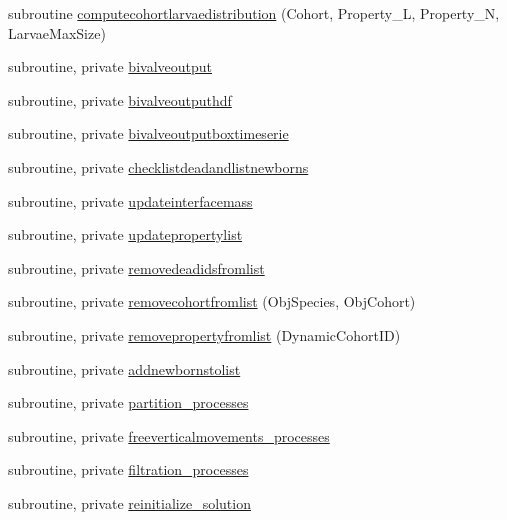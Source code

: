 \begin{DoxyCompactItemize}
subroutine \mbox{\hyperlink{namespacemodulewaterproperties_a21e9506395b0784b11cea81e68719de8}{computecohortlarvaedistribution}} (Cohort, Property\+\_\+L, Property\+\_\+N, Larvae\+Max\+Size)
\item 
subroutine, private \mbox{\hyperlink{namespacemodulewaterproperties_a8446703f7cbfef308ed1b6f7114594a2}{bivalveoutput}}
\item 
subroutine, private \mbox{\hyperlink{namespacemodulewaterproperties_a6d9213c5f38db58c01899d8b68076950}{bivalveoutputhdf}}
\item 
subroutine, private \mbox{\hyperlink{namespacemodulewaterproperties_afcdb7811c7721d558a0d6ec94b87f297}{bivalveoutputboxtimeserie}}
\item 
subroutine, private \mbox{\hyperlink{namespacemodulewaterproperties_ab88c2923a48aacf7da60a45cfeb98dfc}{checklistdeadandlistnewborns}}
\item 
subroutine, private \mbox{\hyperlink{namespacemodulewaterproperties_a20082ef8bcaf7ce51aa737521cbeea5b}{updateinterfacemass}}
\item 
subroutine, private \mbox{\hyperlink{namespacemodulewaterproperties_a8ab7e6ee60b7c71bc6775c1586bd99b3}{updatepropertylist}}
\item 
subroutine, private \mbox{\hyperlink{namespacemodulewaterproperties_a474948faf0bbb3ab44002a8cce97817b}{removedeadidsfromlist}}
\item 
subroutine, private \mbox{\hyperlink{namespacemodulewaterproperties_a3ee71384b4a5e160513a569765f2a4ba}{removecohortfromlist}} (Obj\+Species, Obj\+Cohort)
\item 
subroutine, private \mbox{\hyperlink{namespacemodulewaterproperties_a3d6f2d4c903cf8071d0cba596db412f1}{removepropertyfromlist}} (Dynamic\+Cohort\+ID)
\item 
subroutine, private \mbox{\hyperlink{namespacemodulewaterproperties_a201bc7106a0e1c889114fc878140e91f}{addnewbornstolist}}
\item 
subroutine, private \mbox{\hyperlink{namespacemodulewaterproperties_a24b8d7aa76331b7a72150e027594beba}{partition\+\_\+processes}}
\item 
subroutine, private \mbox{\hyperlink{namespacemodulewaterproperties_a877a92e454e3c5723e48cbb8f6c322d8}{freeverticalmovements\+\_\+processes}}
\item 
subroutine, private \mbox{\hyperlink{namespacemodulewaterproperties_a58f066775e7df388495e6602c2d567e6}{filtration\+\_\+processes}}
\item 
subroutine, private \mbox{\hyperlink{namespacemodulewaterproperties_a3b050fab4946fe3d8840f4104a85e0ab}{reinitialize\+\_\+solution}}

\end{DoxyCompactItemize}
